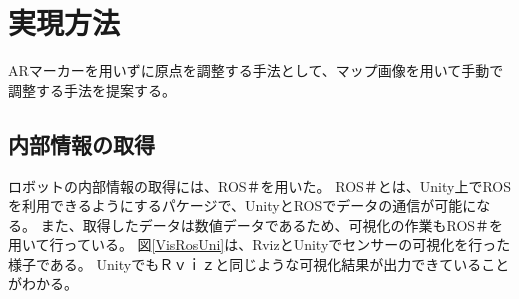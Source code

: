 \chapter{実現方法}\label{chap:method}

ARマーカーを用いずに原点を調整する手法として、マップ画像を用いて手動で調整する手法を提案する。


\section{内部情報の取得}

ロボットの内部情報の取得には、ROS＃を用いた。
ROS＃とは、Unity上でROSを利用できるようにするパケージで、UnityとROSでデータの通信が可能になる。
また、取得したデータは数値データであるため、可視化の作業もROS＃を用いて行っている。
図\ref{VisRosUni}は、RvizとUnityでセンサーの可視化を行った様子である。
UnityでもＲｖｉｚと同じような可視化結果が出力できていることがわかる。


